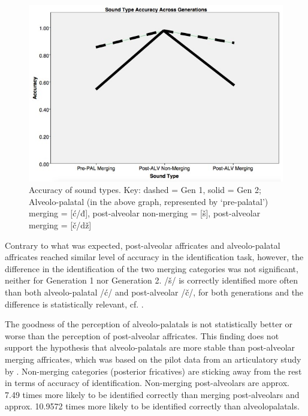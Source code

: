 \documentclass[output=paper,modfonts,nonflat,
]{langsci/langscibook}
\begin{document}
\begin{figure}
\includegraphics[height=.3\textheight]{figures/M_C_Figure 7.jpg}
\caption{\label{fig:mihajlovic:7} Accuracy of sound types. Key: dashed = Gen 1, solid = Gen 2; Alveolo-palatal (in the above graph, represented by ‘pre-palatal’) merging = [ć/đ], post-alveolar non-merging = [š], post-alveolar merging = [č/dž]}
\end{figure}

Contrary to what was expected, post-alveolar affricates and alveolo-palatal affricates reached similar level of accuracy in the identification task, however, the difference in the identification of the two merging categories was not significant, neither for Generation 1 nor Generation 2. /š/ is correctly identified more often than both alveolo-palatal /ć/ and post-alveolar /č/, for both generations and the difference is statistically relevant, cf. .



The goodness of the perception of alveolo-palatals is not statistically better or worse than the perception of post-alveolar affricates. This finding does not support the hypothesis that alveolo-palatals are more stable than post-alveolar merging affricates, which was based on the pilot data from an articulatory study by \citet{Ćavaretal2016}. Non-merging categories (posterior fricatives) are sticking away from the rest in terms of accuracy of identification. Non-merging post-alveolars are approx. 7.49 times more likely to be identified correctly than merging post-alveolars and approx. 10.9572 times more likely to be identified correctly than alveolopalatals.
\end{document}
